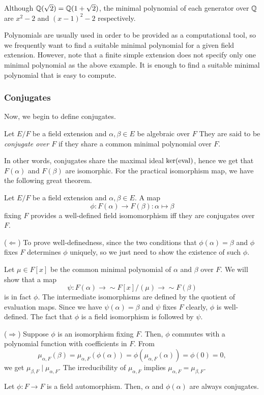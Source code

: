 \documentclass{../exp}
\begin{document}
\begin{ex}
Although $\mathbb{Q}(\sqrt2)=\mathbb{Q}(1+\sqrt2)$, the minimal polynomial of each generator over $\mathbb{Q}$ are $x^2-2$ and $(x-1)^2-2$ respectively.

Polynomials are usually used in order to be provided as a computational tool, so we frequently want to find a suitable minimal polynomial for a given field extension.
However, note that a finite simple extension does not specify only one minimal polynomial as the above example.
It is enough to find a suitable minimal polynomial that is easy to compute.
\end{ex}

\subsubsection{Conjugates}
Now, we begin to define conjugates.

\begin{defn}
Let $E/F$ be a field extension and $\alpha,\beta\in E$ be algebraic over $F$
They are said to be \emph{conjugate over $F$} if they share a common minimal polynomial over $F$.
\end{defn}

In other words, conjugates share the maximal ideal $\ker(\operatorname{eval})$, hence we get that $F(\alpha)$ and $F(\beta)$ are isomorphic.
For the practical isomorphism map, we have the following great theorem.

\begin{thm}
Let $E/F$ be a field extension and $\alpha,\beta\in E$.
A map
\[\phi:F(\alpha)\to F(\beta):\alpha\mapsto\beta\]
fixing $F$ provides a well-defined field isomomorphism iff they are conjugates over $F$.
\end{thm}
\begin{pf}
($\Leftarrow$)
To prove well-definedness, since the two conditions that $\phi(\alpha)=\beta$ and $\phi$ fixes $F$ determines $\phi$ uniquely, so we just need to show the existence of such $\phi$.

Let $\mu\in F[x]$ be the common minimal polynomial of $\alpha$ and $\beta$ over $F$.
We will show that a map
\[\psi:F(\alpha)\to{\sim}F[x]/(\mu)\to{\sim}F(\beta)\]
is in fact $\phi$.
The intermediate isomorphisms are defined by the quotient of evaluation maps.
Since we have $\psi(\alpha)=\beta$ and $\psi$ fixes $F$ clearly, $\phi$ is well-defined.
The fact that $\phi$ is a field isomorphism is followed by $\psi$.

($\Rightarrow$)
Suppose $\phi$ is an isomorphism fixing $F$.
Then, $\phi$ commutes with a polynomial function with coefficients in $F$.
From
\[\mu_{\alpha,F}(\beta)=\mu_{\alpha,F}(\phi(\alpha))=\phi(\mu_{\alpha,F}(\alpha))=\phi(0)=0,\]
we get $\mu_{\beta,F}\mid\mu_{\alpha,F}$.
The irreducibility of $\mu_{\alpha,F}$ implies $\mu_{\alpha,F}=\mu_{\beta,F}$.
\end{pf}
\begin{cor}
Let $\phi:F\to F$ is a field automorphism.
Then, $\alpha$ and $\phi(\alpha)$ are always conjugates.
\end{cor}
\end{document}

